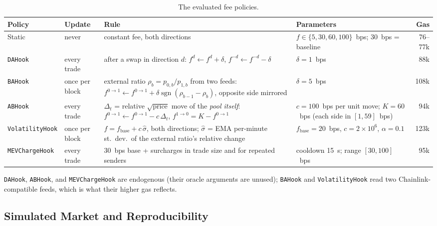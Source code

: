 \documentclass[a4paper,conference]{IEEEtran}
\begin{document}
\begin{table}[t]
  \caption{The evaluated fee policies.}
  \label{tab:policies}
  \centering
  \footnotesize
  \begin{tabular}{@{}llp{5.2cm}p{3.9cm}r@{}}
    \toprule
    \textbf{Policy} & \textbf{Update} & \textbf{Rule} &
    \textbf{Parameters} & \textbf{Gas}\\
    \midrule
    Static & never &
    constant fee, both directions &
    $f\in\{5,30,60,100\}$~bps; 30~bps = baseline &
    76--77k\\
    \addlinespace
    \texttt{DAHook} & every trade &
    after a swap in direction $d$:
    $f^{d}\!\leftarrow\! f^{d}\!+\!\delta$,
    $f^{-d}\!\leftarrow\! f^{-d}\!-\!\delta$ &
    $\delta=1$~bps &
    88k\\
    \addlinespace
    \texttt{BAHook} & once per block &
    external ratio $\rho_b=p_{0,b}/p_{1,b}$ from two feeds:
    $f^{0\to1}\!\leftarrow\! f^{0\to1}\!+\!\delta\operatorname{sgn}(\rho_{b-1}\!-\!\rho_b)$,
    opposite side mirrored &
    $\delta=5$~bps &
    108k\\
    \addlinespace
    \texttt{ABHook} & every trade &
    $\Delta_t$ = relative $\sqrt{\text{price}}$ move of the \emph{pool
    itself}: $f^{0\to1}\!\leftarrow\! f^{0\to1}\!-\!c\,\Delta_t$,
    $f^{1\to0}=K-f^{0\to1}$ &
    $c=100$~bps per unit move; $K=60$~bps (each side in $[1,59]$~bps) &
    94k\\
    \addlinespace
    \texttt{VolatilityHook} & once per block &
    $f=f_{\mathrm{base}}+c\,\hat{\sigma}$, both directions;
    $\hat{\sigma}$ = EMA per-minute st.\ dev.\ of the external ratio's
    relative change &
    $f_{\mathrm{base}}=20$~bps, $c=2\times10^{6}$, $\alpha=0.1$ &
    123k\\
    \addlinespace
    \texttt{MEVChargeHook} & every trade &
    30~bps base + surcharges in trade size and for repeated senders &
    cooldown 15~s; range $[30,100]$~bps &
    95k\\
    \bottomrule
  \end{tabular}
\end{table}

\texttt{DAHook}, \texttt{ABHook}, and \texttt{MEVChargeHook} are
endogenous (their oracle arguments are unused); \texttt{BAHook} and
\texttt{VolatilityHook} read two Chainlink-compatible feeds, which is
what their higher gas reflects.

\subsection{Simulated Market and Reproducibility}
\end{document}
